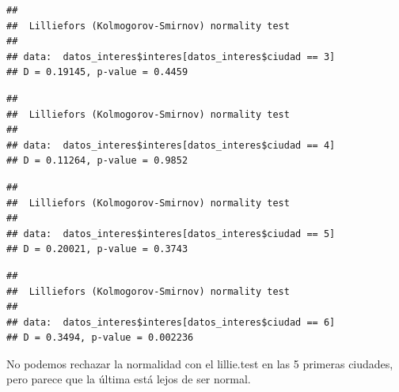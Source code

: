 \documentclass[
]{article}
\newenvironment{Shaded}{\begin{snugshade}}{\end{snugshade}}
\newcommand{\DecValTok}[1]{\textcolor[rgb]{0.00,0.00,0.81}{#1}}
\newcommand{\KeywordTok}[1]{\textcolor[rgb]{0.13,0.29,0.53}{\textbf{#1}}}
\newcommand{\NormalTok}[1]{#1}
\newcommand{\OperatorTok}[1]{\textcolor[rgb]{0.81,0.36,0.00}{\textbf{#1}}}
\begin{document}
\begin{verbatim}
## 
##  Lilliefors (Kolmogorov-Smirnov) normality test
## 
## data:  datos_interes$interes[datos_interes$ciudad == 3]
## D = 0.19145, p-value = 0.4459
\end{verbatim}

\begin{Shaded}
\end{Shaded}

\begin{verbatim}
## 
##  Lilliefors (Kolmogorov-Smirnov) normality test
## 
## data:  datos_interes$interes[datos_interes$ciudad == 4]
## D = 0.11264, p-value = 0.9852
\end{verbatim}

\begin{Shaded}
\end{Shaded}

\begin{verbatim}
## 
##  Lilliefors (Kolmogorov-Smirnov) normality test
## 
## data:  datos_interes$interes[datos_interes$ciudad == 5]
## D = 0.20021, p-value = 0.3743
\end{verbatim}

\begin{Shaded}
\end{Shaded}

\begin{verbatim}
## 
##  Lilliefors (Kolmogorov-Smirnov) normality test
## 
## data:  datos_interes$interes[datos_interes$ciudad == 6]
## D = 0.3494, p-value = 0.002236
\end{verbatim}

No podemos rechazar la normalidad con el lillie.test en las 5 primeras
ciudades, pero parece que la última está lejos de ser normal.
\end{document}
